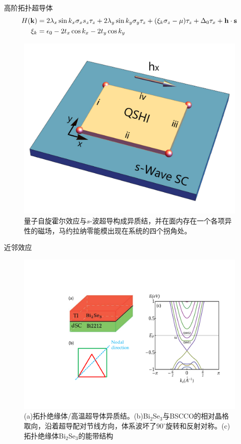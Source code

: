 \documentclass[10pt,aspectratio=169]{beamer} %
\begin{document}
\begin{frame}{高阶拓扑超导体}
\begin{equation}
\begin{aligned}
H(\mathbf{k})&=2\lambda_x\sin k_x\sigma_xs_z\tau_z+2\lambda_y\sin k_y\sigma_y\tau_z+(\xi_k\sigma_z-\mu)\tau_z+\Delta_0\tau_x+{\bf h\cdot s}\\
\xi_k&=\epsilon_0-2t_x\cos k_x-2t_y\cos k_y\label{ze1}
\end{aligned}
\end{equation}
\begin{figure}[h]
	\centering
	\includegraphics[scale=0.1]{pic/fig14.pdf}
	\caption{量子自旋霍尔效应与$s$-波超导构成异质结，并在面内存在一个各项异性的磁场，马约拉纳零能模出现在系统的四个拐角处。}\label{fig13}
\end{figure}
\end{frame}
\begin{frame}{近邻效应}
\begin{figure}[h]
\centering
\includegraphics[scale=0.48]{pic/fig15.pdf}
\caption{(a)拓扑绝缘体/高温超导体异质结。(b)Bi$_2$Se$_3$与BSCCO的相对晶格取向，沿着超导配对节线方向，体系波坏了$90^\circ$旋转和反射对称。(c)拓扑绝缘体Bi$_2$Se$_3$的能带结构}\label{fig14}
\end{figure}
\end{frame}
\end{document}
